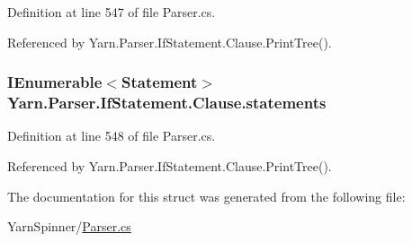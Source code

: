 Definition at line 547 of file Parser.\-cs.



Referenced by Yarn.\-Parser.\-If\-Statement.\-Clause.\-Print\-Tree().

\hypertarget{a00044_a6f4765482e98ed042e38a0ede13f171f}{
\subsubsection[{statements}]{\setlength{\rightskip}{0pt plus 5cm}I\-Enumerable$<${\bf Statement}$>$ Yarn.\-Parser.\-If\-Statement.\-Clause.\-statements\hspace{0.3cm}{\ttfamily [package]}}}\label{a00044_a6f4765482e98ed042e38a0ede13f171f}


Definition at line 548 of file Parser.\-cs.



Referenced by Yarn.\-Parser.\-If\-Statement.\-Clause.\-Print\-Tree().



The documentation for this struct was generated from the following file\-:\begin{DoxyCompactItemize}
\item 
Yarn\-Spinner/\hyperlink{a00301}{Parser.\-cs}\end{DoxyCompactItemize}
